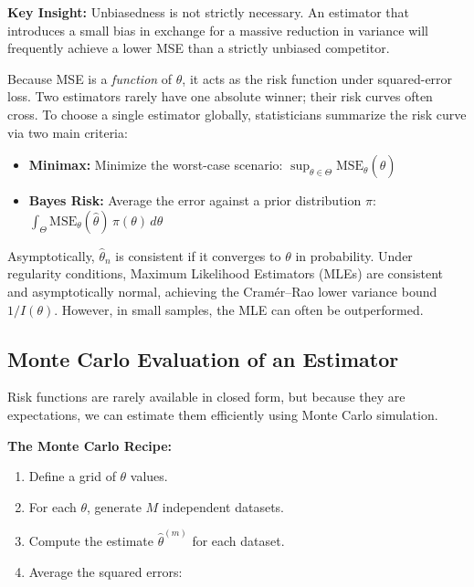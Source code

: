 \documentclass[
  letterpaper,
  DIV=11,
  numbers=noendperiod]{scrreprt}
\providecommand{\tightlist}{%
  \setlength{\itemsep}{0pt}\setlength{\parskip}{0pt}}
\begin{document}
\textbf{Key Insight:} Unbiasedness is not strictly necessary. An
estimator that introduces a small bias in exchange for a massive
reduction in variance will frequently achieve a lower MSE than a
strictly unbiased competitor.

Because MSE is a \emph{function} of \(\theta\), it acts as the risk
function under squared-error loss. Two estimators rarely have one
absolute winner; their risk curves often cross. To choose a single
estimator globally, statisticians summarize the risk curve via two main
criteria:

\begin{itemize}
\tightlist
\item
  \textbf{Minimax:} Minimize the worst-case scenario:
  \(\sup_{\theta \in \Theta} \mathrm{MSE}_{\theta}(\hat\theta)\)
\item
  \textbf{Bayes Risk:} Average the error against a prior distribution
  \(\pi\):
  \(\int_{\Theta} \mathrm{MSE}_{\theta}(\hat\theta)\, \pi(\theta)\, d\theta\)
\end{itemize}

Asymptotically, \(\hat\theta_n\) is consistent if it converges to
\(\theta\) in probability. Under regularity conditions, Maximum
Likelihood Estimators (MLEs) are consistent and asymptotically normal,
achieving the Cramér--Rao lower variance bound \(1/I(\theta)\). However,
in small samples, the MLE can often be outperformed.

\subsection{Monte Carlo Evaluation of an
Estimator}\label{monte-carlo-evaluation-of-an-estimator}

Risk functions are rarely available in closed form, but because they are
expectations, we can estimate them efficiently using Monte Carlo
simulation.

\textbf{The Monte Carlo Recipe:}

\begin{enumerate}
\def\labelenumi{\arabic{enumi}.}
\tightlist
\item
  Define a grid of \(\theta\) values.
\item
  For each \(\theta\), generate \(M\) independent datasets.
\item
  Compute the estimate \(\hat\theta^{(m)}\) for each dataset.
\item
  Average the squared errors:
\end{enumerate}
\end{document}

